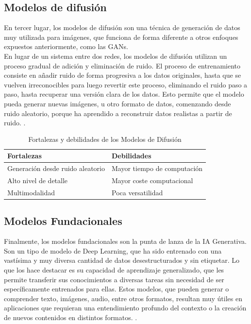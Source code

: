 \subsection{Modelos de difusión}
En tercer lugar, los modelos de difusión son una técnica de generación de datos muy utilizada para 
imágenes, que funciona de forma diferente a otros enfoques expuestos anteriormente, como las GANs.\\

En lugar de un sistema entre dos redes, los modelos de difusión utilizan un proceso gradual de 
adición y eliminación de ruido. El proceso de entrenamiento consiste en añadir ruido de forma 
progresiva a los datos originales, hasta que se vuelven irreconocibles para luego revertir este 
proceso, eliminando el ruido paso a paso, hasta recuperar una versión clara de los datos. Esto 
permite que el modelo pueda generar nuevas imágenes, u otro formato de datos, comenzando desde 
ruido aleatorio, porque ha aprendido a reconstruir datos realistas a partir de ruido. \cite{weng2021diffusion}.

\begin{table}[H]
\centering
\begin{tabularx}{\textwidth}{X|X}
    \textbf{Fortalezas} & \textbf{Debilidades} \\ \hline
    Generación desde ruido aleatorio & Mayor tiempo de computación \\ 
    Alto nivel de detalle & Mayor coste computacional \\ 
    Multimodalidad & Poca versatilidad \\ 
\end{tabularx}
\caption{Fortalezas y debilidades de los Modelos de Difusión}
\end{table}

\subsection{Modelos Fundacionales}
Finalmente, los modelos fundacionales son la punta de lanza de la IA Generativa. Son un tipo de 
modelo de Deep Learning, que ha sido entrenado con una vastísima y muy diversa cantidad de datos 
desestructurados y sin etiquetar. Lo que los hace destacar es su capacidad de aprendizaje 
generalizado, que les permite transferir sus conocimientos a diversas tareas sin necesidad de ser 
específicamente entrenados para ellas. Estos modelos, que pueden generar o comprender texto, 
imágenes, audio, entre otros formatos, resultan muy útiles en aplicaciones que requieran una 
entendimiento profundo del contexto o la creación de nuevos contenidos en distintos formatos. \cite{umay2024llms}.\\

